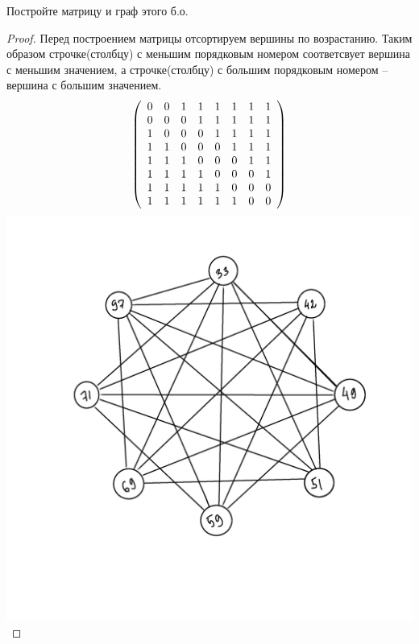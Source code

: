 \begin{problem}
	Постройте матрицу и граф этого б.о.
\end{problem}

\begin{proof}
Перед построением матрицы отсортируем вершины по возрастанию. Таким образом строчке(столбцу) с меньшим порядковым номером соответсвует вершина с меньшим значением, а строчке(столбцу) с большим порядковым номером -- вершина с большим значением.
$$ \left( \begin{array}{c c c c c c c c } 
 
 0 & 0 & 1 & 1 & 1 & 1 & 1 & 1 \\ 

  0 & 0 & 0 & 1 & 1 & 1 & 1 & 1 \\

 1 & 0 & 0 & 0 & 1 & 1 & 1 & 1 \\
 
 1 & 1 & 0 & 0 & 0 & 1 & 1 & 1 \\
 
 1 & 1 & 1 & 0 & 0 & 0 & 1 & 1 \\
 
 1 & 1 & 1 & 1 & 0 & 0 & 0 & 1 \\
 
 1 & 1 & 1 & 1 & 1 & 0 & 0 & 0 \\
 
 1 & 1 & 1 & 1 & 1 & 1 & 0 & 0 \end {array} \right) $$
\newline
 \includegraphics{граф1.png}
\end{proof}


